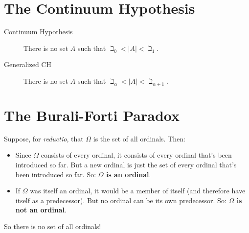 \documentclass[12pt]{extarticle}
\begin{document}
\section{The Continuum Hypothesis}
\begin{description}
\item[Continuum Hypothesis] There is no set $A$ such that \(\beth_0 < |A| < \beth_1\). 
\item[Generalized CH] There is no set \(A\) such that \(\beth_\alpha < |A| < \beth_{\alpha + 1}\).
\end{description}







\section{The Burali-Forti Paradox}

Suppose, for \emph{reductio}, that $\Omega$ is the set of all ordinals. Then: 
\begin{itemize}

\item Since $\Omega$ consists of every ordinal, it consists of every ordinal that's been introduced so far. But a new ordinal is just the set of every ordinal that's been introduced so far. So: \textbf{$\Omega$  is an ordinal}.

\item If $\Omega$ was itself an ordinal, it would be a member of itself (and therefore have itself as a predecessor). But no ordinal can be its own predecessor. So: \textbf{$\Omega$  is not an ordinal}.

\end{itemize}
So there is no set of all ordinals!
\end{document}
